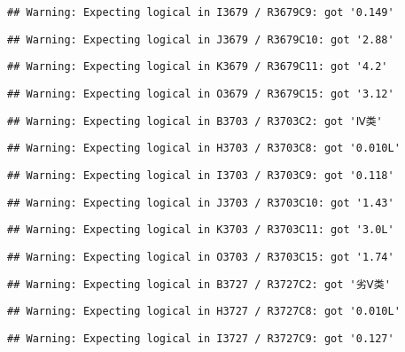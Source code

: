 \documentclass[
]{article}
\begin{document}
\begin{verbatim}
## Warning: Expecting logical in I3679 / R3679C9: got '0.149'
\end{verbatim}

\begin{verbatim}
## Warning: Expecting logical in J3679 / R3679C10: got '2.88'
\end{verbatim}

\begin{verbatim}
## Warning: Expecting logical in K3679 / R3679C11: got '4.2'
\end{verbatim}

\begin{verbatim}
## Warning: Expecting logical in O3679 / R3679C15: got '3.12'
\end{verbatim}

\begin{verbatim}
## Warning: Expecting logical in B3703 / R3703C2: got 'Ⅳ类'
\end{verbatim}

\begin{verbatim}
## Warning: Expecting logical in H3703 / R3703C8: got '0.010L'
\end{verbatim}

\begin{verbatim}
## Warning: Expecting logical in I3703 / R3703C9: got '0.118'
\end{verbatim}

\begin{verbatim}
## Warning: Expecting logical in J3703 / R3703C10: got '1.43'
\end{verbatim}

\begin{verbatim}
## Warning: Expecting logical in K3703 / R3703C11: got '3.0L'
\end{verbatim}

\begin{verbatim}
## Warning: Expecting logical in O3703 / R3703C15: got '1.74'
\end{verbatim}

\begin{verbatim}
## Warning: Expecting logical in B3727 / R3727C2: got '劣Ⅴ类'
\end{verbatim}

\begin{verbatim}
## Warning: Expecting logical in H3727 / R3727C8: got '0.010L'
\end{verbatim}

\begin{verbatim}
## Warning: Expecting logical in I3727 / R3727C9: got '0.127'
\end{verbatim}
\end{document}
